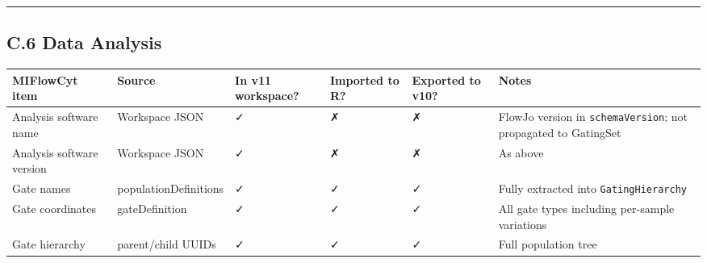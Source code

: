 \documentclass[
]{article}
\begin{document}
\begin{center}\rule{0.5\linewidth}{0.5pt}\end{center}

\subsection{C.6 Data Analysis}\label{c.6-data-analysis}

\begin{longtable}[]{@{}
  >{\raggedright\arraybackslash}p{}
  >{\raggedright\arraybackslash}p{}
  >{\raggedright\arraybackslash}p{}
  >{\raggedright\arraybackslash}p{}
  >{\raggedright\arraybackslash}p{}
  >{\raggedright\arraybackslash}p{}@{}}
\toprule\noalign{}
\begin{minipage}[b]{\linewidth}\raggedright
MIFlowCyt item
\end{minipage} & \begin{minipage}[b]{\linewidth}\raggedright
Source
\end{minipage} & \begin{minipage}[b]{\linewidth}\raggedright
In v11 workspace?
\end{minipage} & \begin{minipage}[b]{\linewidth}\raggedright
Imported to R?
\end{minipage} & \begin{minipage}[b]{\linewidth}\raggedright
Exported to v10?
\end{minipage} & \begin{minipage}[b]{\linewidth}\raggedright
Notes
\end{minipage} \\
\midrule\noalign{}
\endhead
\bottomrule\noalign{}
\endlastfoot
Analysis software name & Workspace JSON & ✓ & ✗ & ✗ & FlowJo version in
\texttt{schemaVersion}; not propagated to GatingSet \\
Analysis software version & Workspace JSON & ✓ & ✗ & ✗ & As above \\
Gate names & populationDefinitions & ✓ & ✓ & ✓ & Fully extracted into
\texttt{GatingHierarchy} \\
Gate coordinates & gateDefinition & ✓ & ✓ & ✓ & All gate types including
per-sample variations \\
Gate hierarchy & parent/child UUIDs & ✓ & ✓ & ✓ & Full population tree

\end{longtable}
\end{document}

